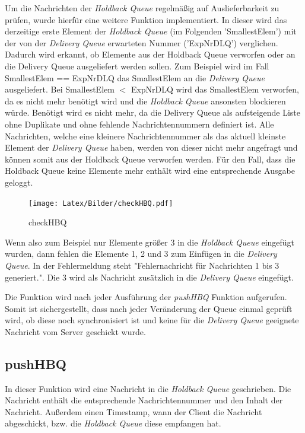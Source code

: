 Um die Nachrichten der \textit{Holdback Queue} regelmäßig auf Auslieferbarkeit zu prüfen, wurde hierfür eine weitere Funktion implementiert. 
In dieser wird das derzeitige erste Element der \textit{Holdback Queue} (im Folgenden 'SmallestElem') mit der von der \textit{Delivery Queue} erwarteten Nummer ('ExpNrDLQ') verglichen. 
Dadurch wird erkannt, ob Elemente aus der Holdback Queue verworfen oder an die Delivery Queue ausgeliefert werden sollen. 
Zum Beispiel wird im Fall SmallestElem == ExpNrDLQ das SmallestElem an die \textit{Delivery Queue} ausgeliefert. Bei SmallestElem $<$ ExpNrDLQ wird das SmallestElem verworfen, da es nicht mehr benötigt wird und die \textit{Holdback Queue} ansonsten blockieren würde. Benötigt wird es nicht mehr, da die Delivery Queue als aufsteigende Liste ohne Duplikate und ohne fehlende Nachrichtennummern definiert ist. Alle Nachrichten, welche eine kleinere Nachrichtennummer als das aktuell kleinste Element der \textit{Delivery Queue} haben, werden von dieser nicht mehr angefragt und können somit aus der Holdback Queue verworfen werden.  
Für den Fall, dass die Holdback Queue keine Elemente mehr enthält wird eine entsprechende Ausgabe geloggt. 

\begin{figure}[htbp]
\begin{center}
\texttt{[image: Latex/Bilder/checkHBQ.pdf]}
\caption{checkHBQ}\label{fig:checkHBQ}
\end{center}
\end{figure}

Wenn also zum Beispiel nur Elemente größer 3 in die \textit{Holdback Queue} eingefügt wurden, dann fehlen die Elemente 1, 2 und 3 zum Einfügen in die \textit{Delivery Queue}. In der Fehlermeldung steht "Fehlernachricht für Nachrichten 1 bis 3 generiert.". Die 3 wird als Nachricht zusätzlich in die \textit{Delivery Queue} eingefügt.

Die Funktion wird nach jeder Ausführung der \textit{pushHBQ} Funktion aufgerufen. Somit ist sichergestellt, dass nach jeder Veränderung der Queue einmal geprüft wird, ob diese noch synchronisiert ist und keine für die \textit{Delivery Queue} geeignete Nachricht vom Server geschickt wurde.

\subsection{pushHBQ} 

In dieser Funktion wird eine Nachricht in die \textit{Holdback Queue} geschrieben. Die Nachricht enthält die entsprechende Nachrichtennummer und den Inhalt der Nachricht. Außerdem einen Timestamp, wann der Client die Nachricht abgeschickt, bzw. die \textit{Holdback Queue} diese empfangen hat. 

